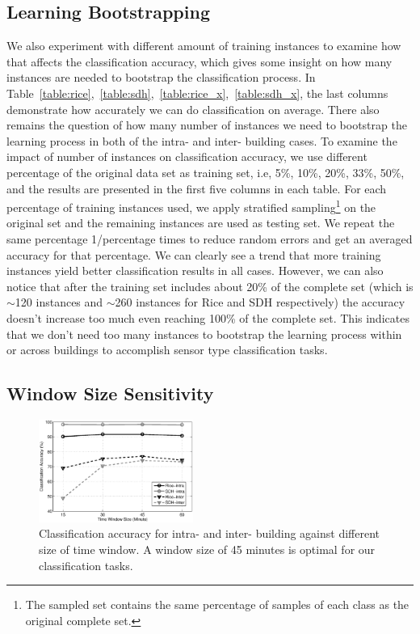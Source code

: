 \subsection{Learning Bootstrapping}
We also experiment with different amount of training instances to examine how that affects the classification accuracy, which gives some insight on how many instances are needed 
to bootstrap the classification process. In Table~\ref{table:rice},~\ref{table:sdh},~\ref{table:rice_x},~\ref{table:sdh_x}, the last columns demonstrate how accurately we can do 
classification on average. There also remains the question of how many number of instances we need to bootstrap the learning process in both of the intra- and inter- building cases. 
To examine the impact of number of instances on classification accuracy, we use different percentage of the original data set as training set, i.e, 5\%, 10\%, 20\%, 33\%, 50\%, and the 
results are presented in the first five columns in each table. For each percentage of training instances used, we apply stratified sampling\footnote{The sampled set contains the same 
percentage of samples of each class as the original complete set.} on the original set and the remaining instances are used as testing set. We repeat the same percentage 1/percentage times 
to reduce random errors and get an averaged accuracy for that percentage. We can clearly see a trend that more training instances yield better classification results in all cases. 
However, we can also notice that after the training set includes about 20\% of the complete set (which is $\sim$120 instances and $\sim$260 instances for Rice and SDH respectively) the 
accuracy doesn't increase too much even reaching 100\% of the complete set. This indicates that we don't need too many instances to bootstrap the learning process within or across buildings 
to accomplish sensor type classification tasks.

\subsection{Window Size Sensitivity}
\begin{figure}[ht!]
\centering
	\includegraphics[width=0.45\textwidth]{./fig/window.eps}
\caption{Classification accuracy for intra- and inter- building against different size of time window. A window size of 45 minutes is optimal for our classification tasks.}
\label{fig:window}
\end{figure}

